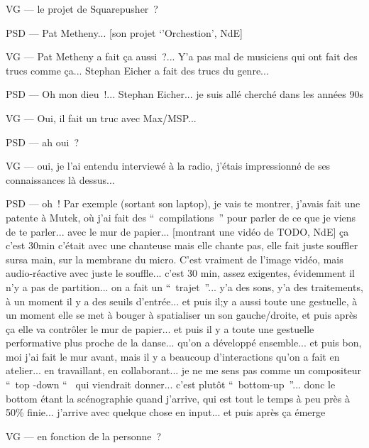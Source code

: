 VG — le projet de Squarepusher ?

PSD — Pat Metheny... [son projet `'Orchestion', NdE]

VG — Pat Metheny a fait ça aussi ?... Y'a pas mal de musiciens qui ont fait des trucs comme ça... Stephan Eicher a fait des trucs du genre...

PSD — Oh mon dieu !... Stephan Eicher... je suis allé cherché dans les années 90s

VG — Oui, il fait un truc avec Max/MSP...

PSD — ah oui ?

VG — oui, je l'ai entendu interviewé à la radio, j'étais impressionné de ses connaissances là dessus...

PSD — oh ! Par exemple (sortant son laptop), je vais te montrer, j'avais fait une patente à Mutek, où j'ai fait des “ compilations ” pour parler de ce que je viens de te parler... avec le mur de papier... [montrant une vidéo de TODO, NdE] ça c'est 30min c'était avec une chanteuse mais elle chante pas, elle fait juste souffler sursa main, sur  la membrane du micro. C'est vraiment de l'image vidéo, mais audio-réactive avec juste le souffle... c'est 30 min, assez exigentes, évidemment il n'y a pas de partition... on a fait un “ trajet ”... y'a des sons, y'a des traitements, à un moment il y a des seuils d'entrée... et puis il;y a aussi toute une gestuelle, à un moment elle se met à bouger à spatialiser un son gauche/droite, et puis après ça elle va contrôler le mur de papier... et puis il y a toute une gestuelle performative plus proche de la danse... qu'on a développé ensemble... et puis bon, moi j'ai fait le mur avant, mais il y a beaucoup d'interactions qu'on a fait en atelier... en travaillant, en collaborant... je ne me sens pas comme un compositeur “ top -down “  qui viendrait donner... c'est plutôt “ bottom-up ”... donc le bottom étant la scénographie quand j'arrive, qui est tout le temps à peu près à 50\% finie... j'arrive avec quelque chose en input... et puis après ça émerge

VG — en fonction de la personne ?

